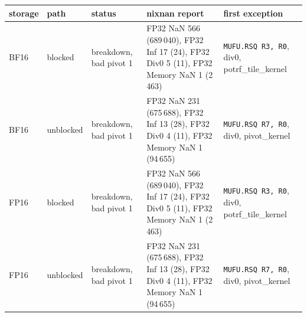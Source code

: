\begin{tabular}{lllp{4.6cm}p{3.6cm}}
\toprule
storage & path & status & nixnan report & first exception\\
\midrule
BF16 & blocked & breakdown, bad pivot 1 & FP32 NaN 566 (689\,040), FP32 Inf 17 (24), FP32 Div0 5 (11), FP32 Memory NaN 1 (2\,463) & \texttt{MUFU.RSQ R3, R0}, div0, potrf\_tile\_kernel\\
BF16 & unblocked & breakdown, bad pivot 1 & FP32 NaN 231 (675\,688), FP32 Inf 13 (28), FP32 Div0 4 (11), FP32 Memory NaN 1 (94\,655) & \texttt{MUFU.RSQ R7, R0}, div0, pivot\_kernel\\
FP16 & blocked & breakdown, bad pivot 1 & FP32 NaN 566 (689\,040), FP32 Inf 17 (24), FP32 Div0 5 (11), FP32 Memory NaN 1 (2\,463) & \texttt{MUFU.RSQ R3, R0}, div0, potrf\_tile\_kernel\\
FP16 & unblocked & breakdown, bad pivot 1 & FP32 NaN 231 (675\,688), FP32 Inf 13 (28), FP32 Div0 4 (11), FP32 Memory NaN 1 (94\,655) & \texttt{MUFU.RSQ R7, R0}, div0, pivot\_kernel\\
\bottomrule
\end{tabular}
